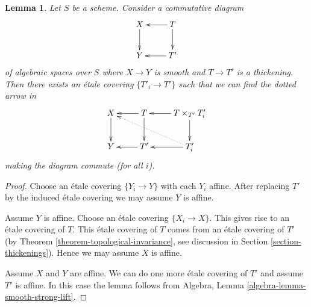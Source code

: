 \documentclass[10pt,a4paper]{amsart}
\theoremstyle{plain}
\newtheorem{lemma}[subsection]{Lemma}
\theoremstyle{definition}
\theoremstyle{remark}
\numberwithin{equation}{subsection}
\begin{document}
\begin{lemma}
\label{lemma-smooth-strong-lift}
Let $S$ be a scheme. Consider a commutative diagram
$$
\xymatrix{
X \ar[d] & T \ar[l] \ar[d] \\
Y & T' \ar[l]
}
$$
of algebraic spaces over $S$ where $X \to Y$ is smooth
and $T \to T'$ is a thickening. Then there exists an
\'etale covering $\{T'_i \to T'\}$ such that we
can find the dotted arrow in
$$
\xymatrix{
X \ar[d] & T \ar[l] \ar[d] & T \times_{T'} T'_i \ar[l] \ar[d] \\
Y & T' \ar[l] & T'_i \ar[l] \ar@{..>}[llu]
}
$$
making the diagram commute (for all $i$).
\end{lemma}

\begin{proof}
Choose an \'etale covering $\{Y_i \to Y\}$ with each $Y_i$ affine.
After replacing $T'$ by the induced \'etale covering we may assume
$Y$ is affine.

\medskip\noindent
Assume $Y$ is affine. Choose an \'etale covering $\{X_i \to X\}$.
This gives rise to an \'etale covering of $T$. This \'etale covering of $T$
comes from an \'etale covering of $T'$
(by Theorem \ref{theorem-topological-invariance}, see
discussion in Section \ref{section-thickenings}).
Hence we may assume $X$ is affine.

\medskip\noindent
Assume $X$ and $Y$ are affine. We can do one more \'etale covering of
$T'$ and assume $T'$ is affine. In this case the lemma follows from
Algebra, Lemma \ref{algebra-lemma-smooth-strong-lift}.
\end{proof}
\end{document}
